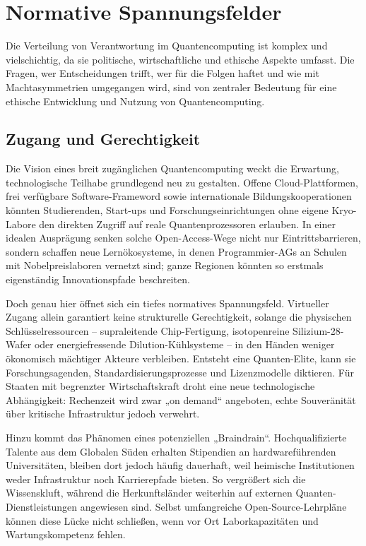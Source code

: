 \section{Normative Spannungsfelder  }
Die Verteilung von Verantwortung im Quantencomputing ist komplex und vielschichtig, da sie politische, wirtschaftliche und ethische Aspekte umfasst. Die Fragen, wer Entscheidungen trifft, wer für die Folgen haftet und wie mit Machtasymmetrien umgegangen wird, sind von zentraler Bedeutung für eine ethische Entwicklung und Nutzung von Quantencomputing.

\subsection{Zugang und Gerechtigkeit}


Die Vision eines breit zugänglichen Quantencomputing weckt die Erwartung, technologische Teilhabe grundlegend neu zu gestalten. Offene Cloud-Plattformen, frei verfügbare Software-Frameword sowie internationale Bildungskooperationen könnten Studierenden, Start-ups und Forschungseinrichtungen ohne eigene Kryo-Labore den direkten Zugriff auf reale Quantenprozessoren erlauben. In einer idealen Ausprägung senken solche Open-Access-Wege nicht nur Eintrittsbarrieren, sondern schaffen neue Lernökosysteme, in denen Programmier-AGs an Schulen mit Nobelpreislaboren vernetzt sind; ganze Regionen könnten so erstmals eigenständig Innovationspfade beschreiten.

Doch genau hier öffnet sich ein tiefes normatives Spannungsfeld. Virtueller Zugang allein garantiert keine strukturelle Gerechtigkeit, solange die physischen Schlüsselressourcen – supraleitende Chip-Fertigung, isotopenreine Silizium-28-Wafer oder energiefressende Dilution-Kühlsysteme – in den Händen weniger ökonomisch mächtiger Akteure verbleiben. Entsteht eine Quanten-Elite, kann sie Forschungsagenden, Standardisierungsprozesse und Lizenzmodelle diktieren. Für Staaten mit begrenzter Wirtschaftskraft droht eine neue technologische Abhängigkeit: Rechenzeit wird zwar „on demand“ angeboten, echte Souveränität über kritische Infrastruktur jedoch verwehrt.

Hinzu kommt das Phänomen eines potenziellen „Braindrain“. Hochqualifizierte Talente aus dem Globalen Süden erhalten Stipendien an hardwareführenden Universitäten, bleiben dort jedoch häufig dauerhaft, weil heimische Institutionen weder Infrastruktur noch Karrierepfade bieten. So vergrößert sich die Wissenskluft, während die Herkunftsländer weiterhin auf externen Quanten-Dienstleistungen angewiesen sind. Selbst umfangreiche Open-Source-Lehrpläne können diese Lücke nicht schließen, wenn vor Ort Laborkapazitäten und Wartungskompetenz fehlen.

